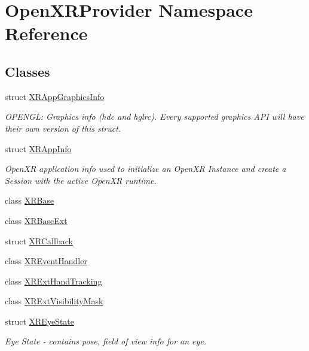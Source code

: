 \hypertarget{namespace_open_x_r_provider}{}\section{Open\+X\+R\+Provider Namespace Reference}
\label{namespace_open_x_r_provider}
\subsection*{Classes}
\begin{DoxyCompactItemize}
\item 
struct \mbox{\hyperlink{struct_open_x_r_provider_1_1_x_r_app_graphics_info}{X\+R\+App\+Graphics\+Info}}
\begin{DoxyCompactList}\small\item\em O\+P\+E\+N\+GL\+: Graphics info (hdc and hglrc). Every supported graphics A\+PI will have their own version of this struct. \end{DoxyCompactList}\item 
struct \mbox{\hyperlink{struct_open_x_r_provider_1_1_x_r_app_info}{X\+R\+App\+Info}}
\begin{DoxyCompactList}\small\item\em Open\+XR application info used to initialize an Open\+XR Instance and create a Session with the active Open\+XR runtime. \end{DoxyCompactList}\item 
class \mbox{\hyperlink{class_open_x_r_provider_1_1_x_r_base}{X\+R\+Base}}
\item 
class \mbox{\hyperlink{class_open_x_r_provider_1_1_x_r_base_ext}{X\+R\+Base\+Ext}}
\item 
struct \mbox{\hyperlink{struct_open_x_r_provider_1_1_x_r_callback}{X\+R\+Callback}}
\item 
class \mbox{\hyperlink{class_open_x_r_provider_1_1_x_r_event_handler}{X\+R\+Event\+Handler}}
\item 
class \mbox{\hyperlink{class_open_x_r_provider_1_1_x_r_ext_hand_tracking}{X\+R\+Ext\+Hand\+Tracking}}
\item 
class \mbox{\hyperlink{class_open_x_r_provider_1_1_x_r_ext_visibility_mask}{X\+R\+Ext\+Visibility\+Mask}}
\item 
struct \mbox{\hyperlink{struct_open_x_r_provider_1_1_x_r_eye_state}{X\+R\+Eye\+State}}
\begin{DoxyCompactList}\small\item\em Eye State -\/ contains pose, field of view info for an eye. \end{DoxyCompactList}\item 

\end{DoxyCompactItemize}
